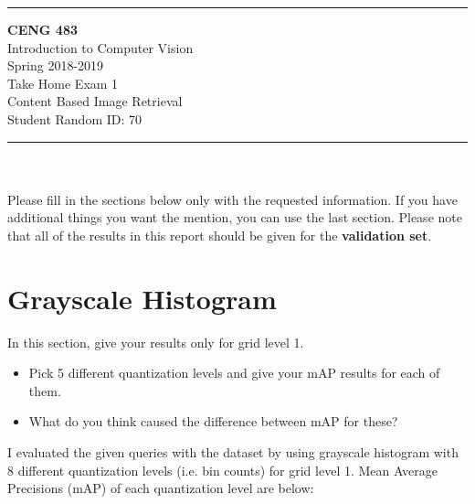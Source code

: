 \documentclass[12pt]{article}
\newcommand{\HRule}{\rule{\linewidth}{1mm}}
\begin{document}
\noindent
\HRule %
\small
\begin{center}
	\LARGE \textbf{CENG 483} \\[4mm]
	\Large Introduction to Computer Vision \\[4mm]
	\normalsize Spring 2018-2019 \\
	\Large Take Home Exam 1 \\
	\Large Content Based Image Retrieval \\
    \Large Student Random ID: 70 \\
\end{center}
\HRule

\begin{center}
\end{center}
\vspace{-10mm}
\noindent\\ \\ 
Please fill in the sections below only with the requested information. If you have additional things you want the mention, you can use the last section. Please note that all of the results in this report should be given for the \textbf{validation set}.
\section{Grayscale Histogram}
In this section, give your results only for grid level 1.

\begin{itemize}
\item Pick 5 different quantization levels and give your mAP results for each of them.
\item What do you think caused the difference between mAP for these?
\end{itemize}

I evaluated the given queries with the dataset by using grayscale histogram with 8 different quantization levels (i.e. bin counts) for grid level 1. Mean Average Precisions (mAP) of each quantization level are below:
\end{document}
